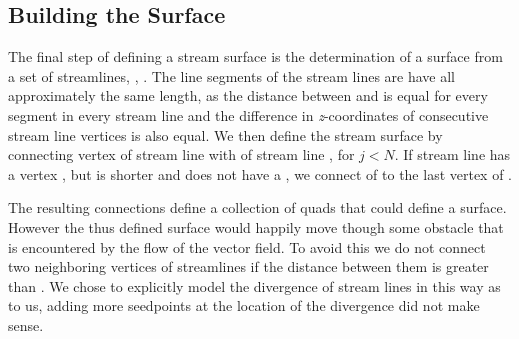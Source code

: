 \subsection{Building the Surface}
\label{s:streamsurface:method:surface}
The final step of defining a stream surface is the determination of a surface from a set of streamlines, , . The line segments of the stream lines are have all approximately the same length, as the distance between  and  is equal for every segment in every stream line and the difference in \textit{z}-coordinates of consecutive stream line vertices is also equal. We then define the stream surface by connecting vertex  of stream line  with  of stream line , for $j < N$. If stream line  has a vertex , but  is shorter and does not have a , we connect  of  to the last vertex of .


The resulting connections define a collection of quads that could define a surface. However the thus defined surface would happily move though some obstacle that is encountered by the flow of the vector field. To avoid this we do not connect two neighboring vertices of streamlines if the distance between them is greater than \divergenceCriterion. We chose to explicitly model the divergence of stream lines in this way as to us, adding more seedpoints at the location of the divergence did not make sense.

